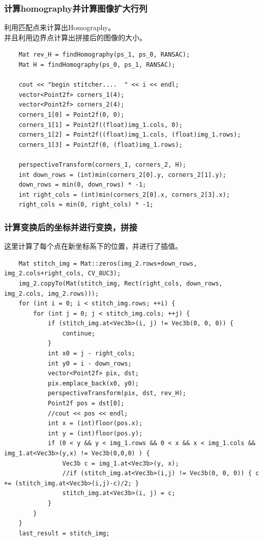 \documentclass{article}
\begin{document}
\subsubsection{计算homography并计算图像扩大行列}
利用匹配点来计算出Homography。\\
并且利用边界点计算出拼接后的图像的大小。
\begin{lstlisting}			
    Mat rev_H = findHomography(ps_1, ps_0, RANSAC);
    Mat H = findHomography(ps_0, ps_1, RANSAC);

    cout << "begin stitcher....  " << i << endl;
    vector<Point2f> corners_1(4);
    vector<Point2f> corners_2(4);
    corners_1[0] = Point2f(0, 0);
    corners_1[1] = Point2f((float)img_1.cols, 0);
    corners_1[2] = Point2f((float)img_1.cols, (float)img_1.rows);
    corners_1[3] = Point2f(0, (float)img_1.rows);

    perspectiveTransform(corners_1, corners_2, H);
    int down_rows = (int)min(corners_2[0].y, corners_2[1].y);
    down_rows = min(0, down_rows) * -1;
    int right_cols = (int)min(corners_2[0].x, corners_2[3].x);
    right_cols = min(0, right_cols) * -1;
\end{lstlisting}
\subsubsection{计算变换后的坐标并进行变换，拼接}
这里计算了每个点在新坐标系下的位置，并进行了插值。
\begin{lstlisting}
    Mat stitch_img = Mat::zeros(img_2.rows+down_rows, img_2.cols+right_cols, CV_8UC3);
    img_2.copyTo(Mat(stitch_img, Rect(right_cols, down_rows, img_2.cols, img_2.rows)));
    for (int i = 0; i < stitch_img.rows; ++i) {
        for (int j = 0; j < stitch_img.cols; ++j) {
            if (stitch_img.at<Vec3b>(i, j) != Vec3b(0, 0, 0)) {
                continue;
            }
            int x0 = j - right_cols;
            int y0 = i - down_rows;
            vector<Point2f> pix, dst;
            pix.emplace_back(x0, y0);
            perspectiveTransform(pix, dst, rev_H);
            Point2f pos = dst[0];
            //cout << pos << endl;
            int x = (int)floor(pos.x);
            int y = (int)floor(pos.y);
            if (0 < y && y < img_1.rows && 0 < x && x < img_1.cols && img_1.at<Vec3b>(y,x) != Vec3b(0,0,0) ) {
                Vec3b c = img_1.at<Vec3b>(y, x);
                //if (stitch_img.at<Vec3b>(i,j) != Vec3b(0, 0, 0)) { c += (stitch_img.at<Vec3b>(i,j)-c)/2; }
                stitch_img.at<Vec3b>(i, j) = c;
            }
        }
    }
    last_result = stitch_img;
\end{lstlisting}
\end{document}
